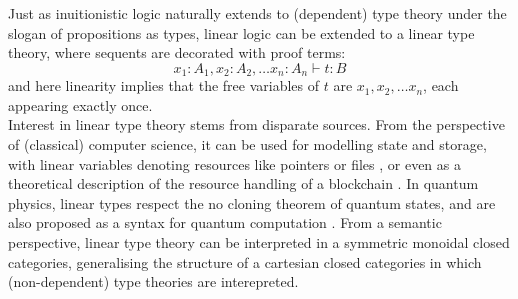 Just as inuitionistic logic naturally extends to (dependent) type theory under the slogan of propositions as types, linear logic can be extended to a linear type theory, where sequents are decorated with proof terms:
\[
  x_1 : A_1, x_2 : A_2, \dots x_n : A_n \vdash t : B
\]
and here linearity implies that the free variables of $t$ are $x_1, x_2, \dots x_n$, each appearing exactly once.\\
Interest in linear type theory stems from disparate sources. From the perspective of (classical) computer science, it can be used for modelling state and storage, with linear variables denoting resources like pointers or files \cite{krishnaswami}, or even as a theoretical description of the resource handling of a blockchain \cite{meredith2015linear}. In quantum physics, linear types respect the no cloning theorem of quantum states, and are also proposed as a syntax for quantum computation \cite{duncan2006types}. From a semantic perspective, linear type theory can be interpreted in a symmetric monoidal closed categories, generalising the structure of a cartesian closed categories in which (non-dependent) type theories are interepreted.\\


